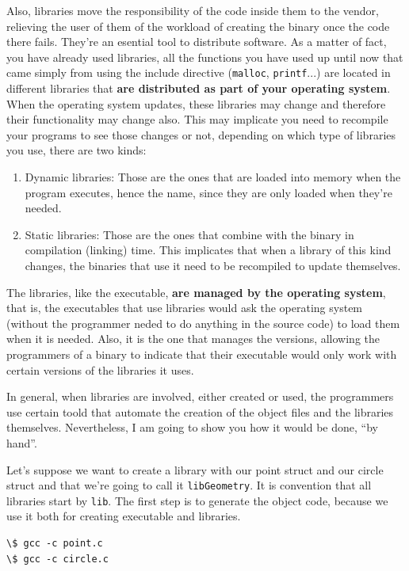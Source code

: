 \documentclass[a4paper]{article}
\begin{document}
Also, libraries move the responsibility of the code inside them to the vendor,
relieving the user of them of the workload of creating the binary once the code
there fails. They're an esential tool to distribute software. As a matter of
fact, you have already used libraries, all the functions you have used up until
now that came simply from using the include directive (\verb!malloc!,
\verb!printf!...) are located in different libraries that \textbf{are
distributed as part of your operating system}. When the operating system
updates, these libraries may change and therefore their functionality may change
also. This may implicate you need to recompile your programs to see those
changes or not, depending on which type of libraries you use, there are two
kinds:

\begin{enumerate}
\item Dynamic libraries: Those are the ones that are loaded into memory when
the program executes, hence the name, since they are only loaded when they're
needed.
\item Static libraries: Those are the ones that combine with the binary in
compilation (linking) time. This implicates that when a library of this kind
changes, the binaries that use it need to be recompiled to update themselves.
\end{enumerate}

The libraries, like the executable, \textbf{are managed by the operating
system}, that is, the executables that use libraries would ask the operating
system (without the programmer neded to do anything in the source code) to load
them when it is needed. Also, it is the one that manages the versions, allowing
the programmers of a binary to indicate that their executable would only work
with certain versions of the libraries it uses.

In general, when libraries are involved, either created or used, the programmers
use certain toold that automate the creation of the object files and the
libraries themselves. Nevertheless, I am going to show you how it would be done,
``by hand''.

Let's suppose we want to create a library with our point struct and our circle
struct and that we're going to call it \verb!libGeometry!. It is convention that
all libraries start by \verb!lib!. The first step is to generate the object
code, because we use it both for creating executable and libraries.
\begin{lstlisting}[style=terminalStyle]
\$ gcc -c point.c
\$ gcc -c circle.c
\end{lstlisting}
\end{document}
